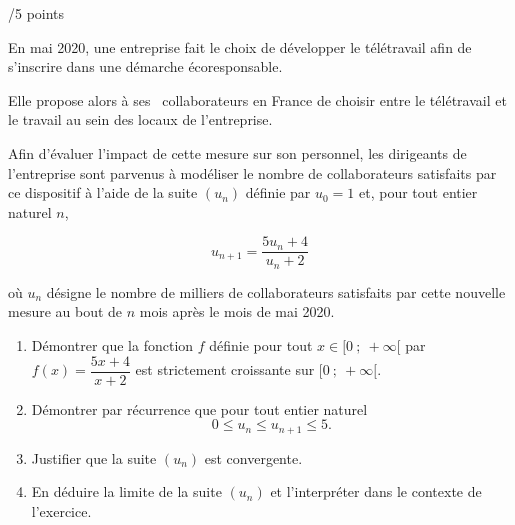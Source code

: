 \documentclass[a4paper]{article}
\begin{document}
\begin{exerciceinterro}{\hspace{2cm}/5 points}{}


En mai 2020, une entreprise fait le choix de développer le télétravail afin de s'inscrire dans une démarche écoresponsable.

Elle propose alors à ses ~collaborateurs en France de choisir entre le télétravail et le travail au sein des locaux de l'entreprise.

\medskip

Afin d'évaluer l'impact de cette mesure sur son personnel, les dirigeants de l'entreprise sont parvenus à modéliser le nombre de collaborateurs satisfaits par ce dispositif à l'aide de la suite 
$\left(u_n\right)$ définie par $u_0 = 1$ et, pour tout entier naturel $n$,

\[u_{n+1}  = \dfrac{5u_n + 4}{u_n + 2}\]

où $u_n$ désigne le nombre de milliers de collaborateurs satisfaits par cette nouvelle mesure au bout de $n$ mois après le mois de mai 2020.

\medskip

\begin{enumerate}
\item Démontrer que la fonction $f$ définie pour tout $x \in  [0~;~ +\infty[$ par $f(x) = \dfrac{5x+4}{x+2}$ est 
strictement croissante sur $[0~;~+ \infty[$.
		\item Démontrer par récurrence que pour tout entier naturel 
		\[0 \leqslant u_n \leqslant u_{n+1}  \leqslant  5.\]
		
		\item Justifier que la suite $\left(u_n\right)$ est convergente.

\item En déduire la limite de la suite $\left(u_n\right)$ et l'interpréter dans le contexte de l'exercice.
\end{enumerate}

\end{exerciceinterro}
\end{document}

